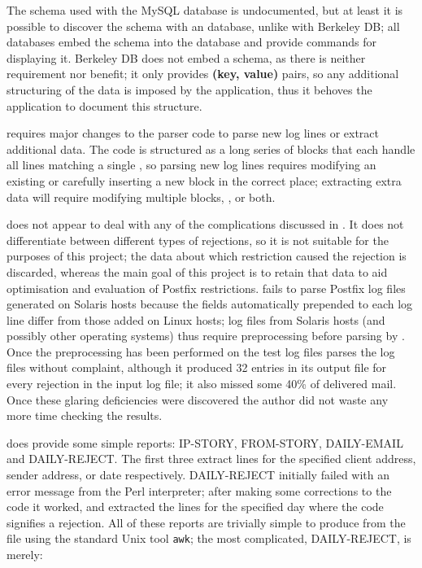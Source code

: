 The schema used with the MySQL database is undocumented, but at least it is
possible to discover the schema with an \SQL{} database, unlike with
Berkeley DB\@; all \SQL{} databases embed the schema into the database and
provide commands for displaying it.  Berkeley DB does not embed a schema,
as there is neither requirement nor benefit; it only provides \textbf{(key,
value)} pairs, so any additional structuring of the data is imposed by the
application, thus it behoves the application to document this structure.

\LMA{} requires major changes to the parser code to parse new log lines or
extract additional data.  The code is structured as a long series of blocks
that each handle all lines matching a single \regex{}, so parsing new log
lines requires modifying an existing \regex{} or carefully inserting a new
block in the correct place; extracting extra data will require modifying
multiple blocks, \regexes{}, or both.

\LMA{} does not appear to deal with any of the complications discussed in
.  It does not differentiate between different
types of rejections, so it is not suitable for the purposes of this
project; the data about which restriction caused the rejection is
discarded, whereas the main goal of this project is to retain that data to
aid optimisation and evaluation of Postfix restrictions.  \LMA{} fails to
parse Postfix log files generated on Solaris hosts because the fields
automatically prepended to each log line differ from those added on Linux
hosts; log files from Solaris hosts (and possibly other operating systems)
thus require preprocessing before parsing by \LMA{}.  Once the
preprocessing has been performed on the \numberOFlogFILES{} test log files
\LMA{} parses the log files without complaint, although it produced 32
entries in its output file for every rejection in the input log file; it
also missed some 40\% of delivered mail.  Once these glaring deficiencies
were discovered the author did not waste any more time checking the
results.

\LMA{} does provide some simple reports: IP-STORY, FROM-STORY, DAILY-EMAIL
and DAILY-REJECT\@.  The first three extract \CSV{} lines for the specified
client \IP{} address, sender address, or date respectively.  DAILY-REJECT
initially failed with an error message from the Perl interpreter; after
making some corrections to the code it worked, and extracted the \CSV{}
lines for the specified day where the \SMTP{} code signifies a rejection.
All of these reports are trivially simple to produce from the \CSV{} file
using the standard Unix tool \texttt{awk}; the most complicated,
DAILY-REJECT, is merely:

